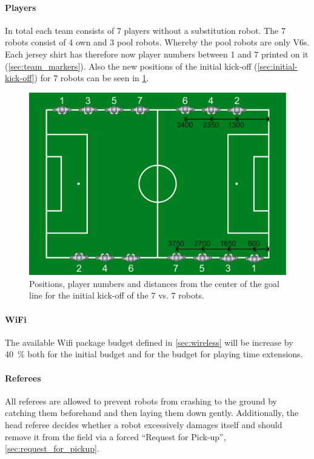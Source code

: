         \paragraph{Players}
            In total each team consists of 7 players without a substitution robot. The 7 robots consist of 4 own and 3 pool robots. Whereby the pool robots are only V6s. Each jersey shirt has therefore now player numbers between 1 and 7 printed on it (\cf \cref{sec:team_markers}). Also the new positions of the initial kick-off (\cf \cref{sec:initial-kick-off}) for 7 robots can be seen in \cref{fig:initial_positions_7vs7}.
            \begin{figure}[t!]
            	\begin{center}
            		\leavevmode
            		\includegraphics[width=1\columnwidth]{figs/initial_positions_7vs7.pdf}
            		\caption{Positions, player numbers and distances from the center of the goal line for the initial kick-off of the 7 vs. 7 robots.}
            		\label{fig:initial_positions_7vs7}
            	\end{center}
            \end{figure}

        \paragraph{WiFi}
            The available Wifi package budget defined in \cref{sec:wireless} will be increase by \qty{40}{\percent} both for the initial budget and for the budget for playing time extensions.  

        \paragraph{Referees}
            \label{sec:7vs7:referee}
            All referees are allowed to prevent robots from crashing to the ground by catching them beforehand and then laying them down gently. Additionally, the head referee decides whether a robot excessively damages itself and should remove it from the field via a forced ``Request for Pick-up'', \cf \cref{sec:request_for_pickup}.

